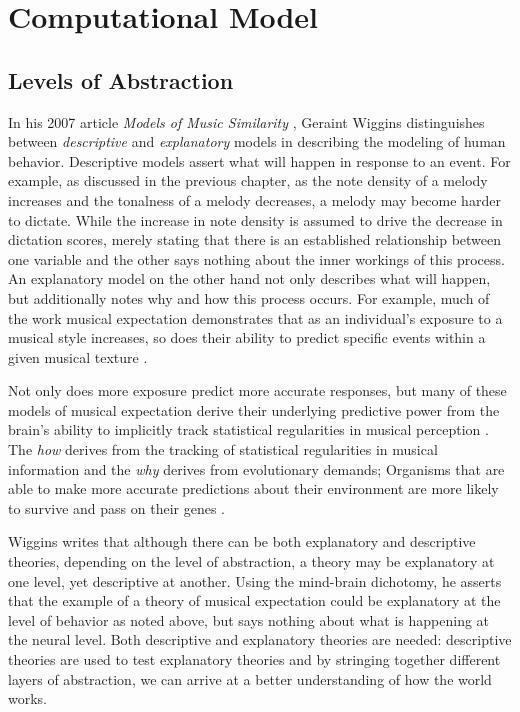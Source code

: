 \documentclass[]{book}
\theoremstyle{definition}
\theoremstyle{definition}
\theoremstyle{definition}
\theoremstyle{remark}
\begin{document}
\hypertarget{computational-model}{%
\chapter{Computational Model}\label{computational-model}}

\hypertarget{levels-of-abstraction}{%
\section{Levels of Abstraction}\label{levels-of-abstraction}}

In his 2007 article \emph{Models of Music Similarity}
\citep{wigginsModelsMusicalSimilarity2007}, Geraint Wiggins
distinguishes between \emph{descriptive} and \emph{explanatory} models
in describing the modeling of human behavior. Descriptive models assert
what will happen in response to an event. For example, as discussed in
the previous chapter, as the note density of a melody increases and the
tonalness of a melody decreases, a melody may become harder to dictate.
While the increase in note density is assumed to drive the decrease in
dictation scores, merely stating that there is an established
relationship between one variable and the other says nothing about the
inner workings of this process. An explanatory model on the other hand
not only describes what will happen, but additionally notes why and how
this process occurs. For example, much of the work musical expectation
demonstrates that as an individual's exposure to a musical style
increases, so does their ability to predict specific events within a
given musical texture
\citep{pearceStatisticalLearningProbabilistic2018a}.

Not only does more exposure predict more accurate responses, but many of
these models of musical expectation derive their underlying predictive
power from the brain's ability to implicitly track statistical
regularities in musical perception
\citep{saffranStatisticalLearningTone1999, margulisRepeatHowMusic2014}.
The \emph{how} derives from the tracking of statistical regularities in
musical information and the \emph{why} derives from evolutionary
demands; Organisms that are able to make more accurate predictions about
their environment are more likely to survive and pass on their genes
\citep{huronSweetAnticipation2006}.

Wiggins writes that although there can be both explanatory and
descriptive theories, depending on the level of abstraction, a theory
may be explanatory at one level, yet descriptive at another. Using the
mind-brain dichotomy, he asserts that the example of a theory of musical
expectation could be explanatory at the level of behavior as noted
above, but says nothing about what is happening at the neural level.
Both descriptive and explanatory theories are needed: descriptive
theories are used to test explanatory theories and by stringing together
different layers of abstraction, we can arrive at a better understanding
of how the world works.
\end{document}
